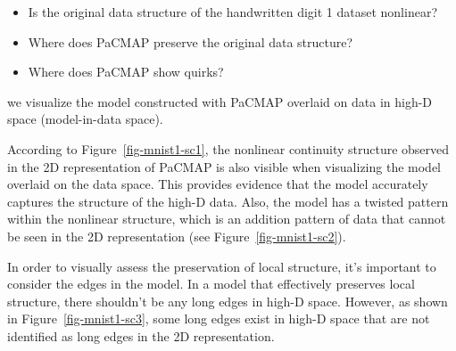 \documentclass[
  12pt]{article}
\providecommand{\tightlist}{%
  \setlength{\itemsep}{0pt}\setlength{\parskip}{0pt}}\usepackage{longtable,booktabs,array}
\begin{document}
\begin{itemize}
\tightlist
\item
  Is the original data structure of the handwritten digit 1 dataset
  nonlinear?
\item
  Where does PaCMAP preserve the original data structure?
\item
  Where does PaCMAP show quirks?
\end{itemize}

we visualize the model constructed with PaCMAP overlaid on data in
high-D space (model-in-data space).

According to Figure~\ref{fig-mnist1-sc1}, the nonlinear continuity
structure observed in the 2D representation of PaCMAP is also visible
when visualizing the model overlaid on the data space. This provides
evidence that the model accurately captures the structure of the high-D
data. Also, the model has a twisted pattern within the nonlinear
structure, which is an addition pattern of data that cannot be seen in
the 2D representation (see Figure~\ref{fig-mnist1-sc2}).

In order to visually assess the preservation of local structure, it's
important to consider the edges in the model. In a model that
effectively preserves local structure, there shouldn't be any long edges
in high-D space. However, as shown in Figure~\ref{fig-mnist1-sc3}, some
long edges exist in high-D space that are not identified as long edges
in the 2D representation.
\end{document}
